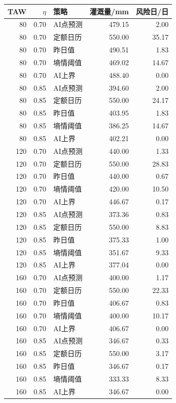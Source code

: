 \begin{tabular}{rrlrr}
\toprule
TAW & $\eta$ & 策略 & 灌溉量/mm & 风险日/日 \\
\midrule
80 & 0.70 & AI点预测 & 479.15 & 2.00 \\
80 & 0.70 & 定额日历 & 550.00 & 35.17 \\
80 & 0.70 & 昨日值 & 490.51 & 1.83 \\
80 & 0.70 & 墒情阈值 & 469.02 & 14.67 \\
80 & 0.70 & AI上界 & 488.40 & 0.00 \\
80 & 0.85 & AI点预测 & 394.60 & 2.00 \\
80 & 0.85 & 定额日历 & 550.00 & 24.17 \\
80 & 0.85 & 昨日值 & 403.95 & 1.83 \\
80 & 0.85 & 墒情阈值 & 386.25 & 14.67 \\
80 & 0.85 & AI上界 & 402.21 & 0.00 \\
120 & 0.70 & AI点预测 & 440.00 & 1.33 \\
120 & 0.70 & 定额日历 & 550.00 & 28.83 \\
120 & 0.70 & 昨日值 & 440.00 & 0.67 \\
120 & 0.70 & 墒情阈值 & 420.00 & 10.50 \\
120 & 0.70 & AI上界 & 446.67 & 0.17 \\
120 & 0.85 & AI点预测 & 373.36 & 0.83 \\
120 & 0.85 & 定额日历 & 550.00 & 8.83 \\
120 & 0.85 & 昨日值 & 375.33 & 1.00 \\
120 & 0.85 & 墒情阈值 & 351.67 & 9.33 \\
120 & 0.85 & AI上界 & 377.04 & 0.00 \\
160 & 0.70 & AI点预测 & 400.00 & 1.17 \\
160 & 0.70 & 定额日历 & 550.00 & 22.33 \\
160 & 0.70 & 昨日值 & 406.67 & 0.83 \\
160 & 0.70 & 墒情阈值 & 400.00 & 10.17 \\
160 & 0.70 & AI上界 & 406.67 & 0.00 \\
160 & 0.85 & AI点预测 & 346.67 & 0.33 \\
160 & 0.85 & 定额日历 & 550.00 & 3.17 \\
160 & 0.85 & 昨日值 & 346.67 & 0.17 \\
160 & 0.85 & 墒情阈值 & 333.33 & 8.33 \\
160 & 0.85 & AI上界 & 346.67 & 0.00 \\
\bottomrule
\end{tabular}
